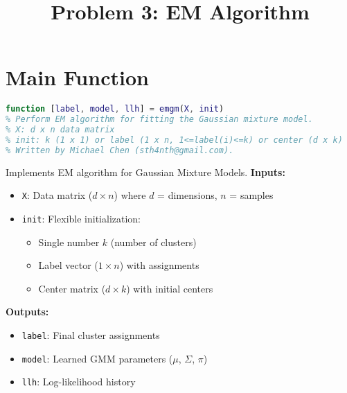 \documentclass[11pt]{article}
\title{Problem 3: EM Algorithm}
\author{}
\date{}
\begin{document}
\maketitle

\newenvironment{codeexplain}[1][\linewidth]{%
    \begin{minipage}{#1}
    \begin{minipage}[t]{0.48\linewidth}
}{%
    \end{minipage}
    \end{minipage}
}

\section{Main Function}

\begin{minipage}{\textwidth}
\begin{minipage}[t]{0.48\textwidth}
\begin{lstlisting}[language=Matlab, firstnumber=1]
function [label, model, llh] = emgm(X, init)
% Perform EM algorithm for fitting the Gaussian mixture model.
% X: d x n data matrix
% init: k (1 x 1) or label (1 x n, 1<=label(i)<=k) or center (d x k)
% Written by Michael Chen (sth4nth@gmail.com).
\end{lstlisting}
\end{minipage}
\hfill
\begin{minipage}[t]{0.48\textwidth}
Implements EM algorithm for Gaussian Mixture Models.
\textbf{Inputs:}
\begin{itemize}
\item \texttt{X}: Data matrix ($d \times n$) where $d$ = dimensions, $n$ = samples
\item \texttt{init}: Flexible initialization:
    \begin{itemize}
    \item Single number $k$ (number of clusters)
    \item Label vector ($1 \times n$) with assignments
    \item Center matrix ($d \times k$) with initial centers
    \end{itemize}
\end{itemize}
\textbf{Outputs:}
\begin{itemize}
\item \texttt{label}: Final cluster assignments
\item \texttt{model}: Learned GMM parameters ($\mu$, $\Sigma$, $\pi$)
\item \texttt{llh}: Log-likelihood history
\end{itemize}
\end{minipage}
\end{minipage}
\end{document}
